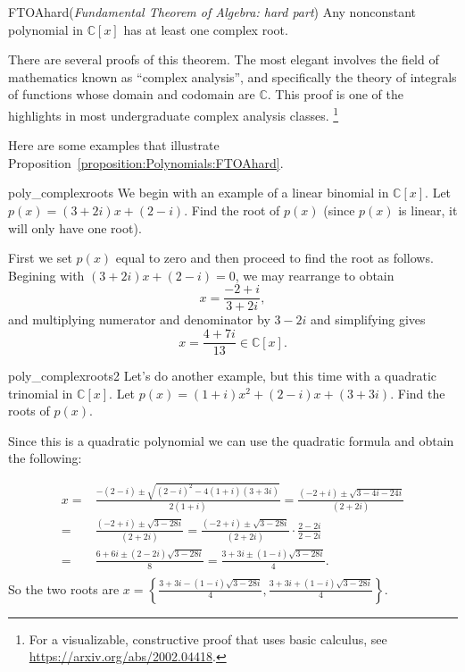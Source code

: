 \begin{prop}{FTOAhard}(\emph{Fundamental Theorem of Algebra: hard part})
Any nonconstant polynomial in $\mathbb{C}[x]$ has at least one complex root.
\end {prop}

There are several proofs of this theorem. The most elegant involves the field of mathematics known as ``complex analysis'', and specifically the theory of integrals of functions whose domain and codomain are $\mathbb{C}$.  This proof is one of the highlights in most undergraduate complex analysis classes. \footnote{For a visualizable, constructive proof that uses basic calculus, see \url{https://arxiv.org/abs/2002.04418}.}

Here are some examples that illustrate Proposition~\ref{proposition:Polynomials:FTOAhard}. 

\begin{example}{poly_complexroots} 
We begin with an example of a linear binomial in $\mathbb{C}[x]$. 
Let $p(x)=(3+2i)x+(2-i)$. Find the root of $p(x)$ (since $p(x)$ is linear, it will only have one root).

First we set $p(x)$ equal to zero and then proceed to find the root as follows. Begining with
$(3+2i)x+(2-i)=0$, we may rearrange to obtain
$$x=\frac{-2+i}{3+2i},$$
and multiplying numerator and denominator by $3 - 2i$ and simplifying gives
$$x=\frac{4+7i}{13}\in \mathbb{C}[x].$$
\end{example}

\begin{example}{poly_complexroots2} 
Let's do another example, but this time with a quadratic trinomial in $\mathbb{C}[x]$. 
Let $p(x)=(1+i)x^2+(2-i)x+(3+3i)$. Find the roots of $p(x)$.

Since this is a quadratic polynomial we can use the quadratic formula and obtain the following:

\begin{align*}
x=&\frac {-(2-i) \pm \sqrt{(2-i)^2-4(1+i)(3+3i)}}{2(1+i)}=\frac {(-2+i) \pm \sqrt{3-4i-24i}}{(2+2i)}\\
=&\frac {(-2+i) \pm \sqrt{3-28i}}{(2+2i)}=\frac {(-2+i) \pm \sqrt{3-28i}}{(2+2i)}\cdot \frac {2-2i}{2-2i}\\
=&\frac{6+6i\pm (2-2i)\sqrt{3-28i}}{8}=\frac{3+3i\pm (1-i)\sqrt{3-28i}}{4}.\\
\end{align*}
So the two roots are $x=\left\{\frac{3+3i- (1-i)\sqrt{3-28i}}{4}, \frac{3+3i+ (1-i)\sqrt{3-28i}}{4}\right\}$.
\end{example}


